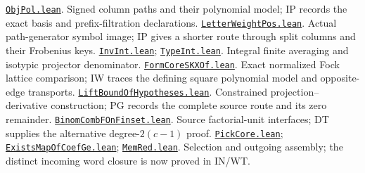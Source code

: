 \documentclass[11pt,a4paper]{article}
\numberwithin{equation}{section}
\theoremstyle{remark}\newtheorem{remark}[theorem]{Remark}
\newcommand{\src}[2]{\href{https://github.com/CocoSgt/riemann-hypothesis-lean/blob/7cbf7a0c32fca1badf05931879a37c3f8a2b03b4/src/#1}{\texttt{#2}}}
\begin{document}
\begin{thebibliography}{99}
 \src{Formalism/SharpRestriction/GrowthBounds/ObjPol.lean}{ObjPol.lean}. Signed column paths and their polynomial model; IP records the exact basis and prefix-filtration declarations.
 \src{Formalism/SharpRestriction/GrowthBounds/PathWeight/LetterWeightPos.lean}{LetterWeightPos.lean}. Actual path-generator symbol image; IP gives a shorter route through split columns and their Frobenius keys.
 \src{Formalism/ThetaLogCoordinates/TraceIsometryWeights/SchurTraceProofs/InvInt.lean}{InvInt.lean}; \src{Formalism/ThetaLogCoordinates/TraceIsometryWeights/SchurTraceProofs/TypeInt.lean}{TypeInt.lean}. Integral finite averaging and isotypic projector denominator.
 \src{Formalism/SharpRestriction/GrowthBounds/DualFockLinear/FormCoreSKXOf.lean}{FormCoreSKXOf.lean}. Exact normalized Fock lattice comparison; IW traces the defining square polynomial model and opposite-edge transports.
 \src{Formalism/SharpRestriction/GrowthBounds/MonomialOrderSegments/LiftBoundOfHypotheses.lean}{LiftBoundOfHypotheses.lean}. Constrained projection--derivative construction; PG records the complete source route and its zero remainder.
 \src{Formalism/SharpRestriction/GrowthBounds/DiagonalSupport/BinomCombFOnFinset.lean}{BinomCombFOnFinset.lean}. Source factorial-unit interfaces; DT supplies the alternative degree-$2(c-1)$ proof.
 \src{Formalism/SharpRestriction/GrowthBounds/DiagonalSupport/PickCore.lean}{PickCore.lean}; \src{Formalism/SharpRestriction/GrowthBounds/DiagonalSupport/ExistsMapOfCoefGe.lean}{ExistsMapOfCoefGe.lean}; \src{Formalism/SharpRestriction/GrowthBounds/TwistedSubstitution/MemRed.lean}{MemRed.lean}. Selection and outgoing assembly; the distinct incoming word closure is now proved in IN/WT.


\end{thebibliography}
\end{document}
